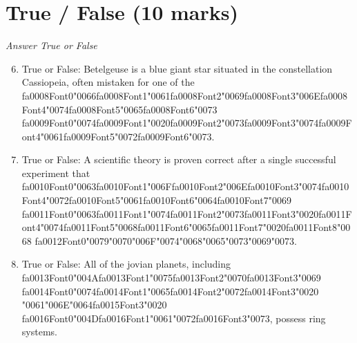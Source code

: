 \documentclass[12pt]{article}
\begin{document}
\section*{True / False (10 marks)}
\textit{Answer True or False}
\begin{enumerate}[label=\arabic*.]
\setcounter{enumi}{5}
\item True or False: Betelgeuse is a blue giant star situated in the constellation Cassiopeia, often mistaken for one of the {\csname fa0008Font0\endcsname\char"0066}{\csname fa0008Font1\endcsname\char"0061}{\csname fa0008Font2\endcsname\char"0069}{\csname fa0008Font3\endcsname\char"006E}{\csname fa0008Font4\endcsname\char"0074}{\csname fa0008Font5\endcsname\char"0065}{\csname fa0008Font6\endcsname\char"0073} {\csname fa0009Font0\endcsname\char"0074}{\csname fa0009Font1\endcsname\char"0020}{\csname fa0009Font2\endcsname\char"0073}{\csname fa0009Font3\endcsname\char"0074}{\csname fa0009Font4\endcsname\char"0061}{\csname fa0009Font5\endcsname\char"0072}{\csname fa0009Font6\endcsname\char"0073}.
\item True or False: A scientific theory is proven correct after a single successful experiment that {\csname fa0010Font0\endcsname\char"0063}{\csname fa0010Font1\endcsname\char"006F}{\csname fa0010Font2\endcsname\char"006E}{\csname fa0010Font3\endcsname\char"0074}{\csname fa0010Font4\endcsname\char"0072}{\csname fa0010Font5\endcsname\char"0061}{\csname fa0010Font6\endcsname\char"0064}{\csname fa0010Font7\endcsname\char"0069} {\csname fa0011Font0\endcsname\char"0063}{\csname fa0011Font1\endcsname\char"0074}{\csname fa0011Font2\endcsname\char"0073}{\csname fa0011Font3\endcsname\char"0020}{\csname fa0011Font4\endcsname\char"0074}{\csname fa0011Font5\endcsname\char"0068}{\csname fa0011Font6\endcsname\char"0065}{\csname fa0011Font7\endcsname\char"0020}{\csname fa0011Font8\endcsname\char"0068} {\csname fa0012Font0\endcsname\char"0079}{\char"0070}{\char"006F}{\char"0074}{\char"0068}{\char"0065}{\char"0073}{\char"0069}{\char"0073}.
\item True or False: All of the jovian planets, including {\csname fa0013Font0\endcsname\char"004A}{\csname fa0013Font1\endcsname\char"0075}{\csname fa0013Font2\endcsname\char"0070}{\csname fa0013Font3\endcsname\char"0069} {\csname fa0014Font0\endcsname\char"0074}{\csname fa0014Font1\endcsname\char"0065}{\csname fa0014Font2\endcsname\char"0072}{\csname fa0014Font3\endcsname\char"0020} {\char"0061}{\char"006E}{\char"0064}{\csname fa0015Font3\endcsname\char"0020} {\csname fa0016Font0\endcsname\char"004D}{\csname fa0016Font1\endcsname\char"0061}{\char"0072}{\csname fa0016Font3\endcsname\char"0073}, possess ring systems.

\end{enumerate}
\end{document}
